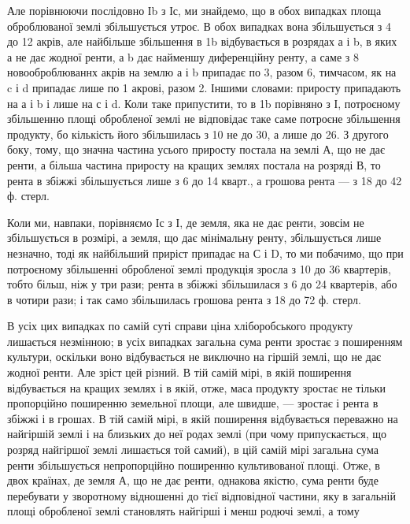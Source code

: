 Але порівнюючи послідовно Іb з Іс, ми знайдемо, що в обох випадках площа
оброблюваної землі збільшується утроє. В обох випадках вона збільшується з
4 до 12 акрів, але найбільше збільшення в 1b відбувається в розрядах
а і b, в яких а не дає жодної ренти, а b дає найменшу
диференційну ренту, а саме з 8 новооброблюваннх акрів на землю а і b
припадає по 3, разом 6, тимчасом,
як на c і d припадає лише по 1 акрові, разом 2. Іншими словами:  приросту
припадають на а і b і лише  на с і d. Коли таке припустити, то в
1b порівняно з І, потроєному збільшенню площі обробленої землі не відповідає
таке саме потроєне збільшення продукту, бо кількість його збільшилась з 10
не до 30, а лише до 26. З другого боку, тому, що значна частина усього приросту
постала на землі А, що не дає ренти, а більша частина приросту на
кращих землях постала на розряді В, то рента в збіжжі збільшується лише
з 6 до 14 кварт., а грошова рента — з 18 до 42 ф. стерл.

Коли ми, навпаки, порівняємо Іс з І, де земля, яка не дає ренти, зовсім
не збільшується в розмірі, а земля, що дає мінімальну ренту, збільшується
лише незначно, тоді як найбільший приріст припадає на С і D, то ми побачимо,
що при потроєному збільшенні обробленої землі продукція зросла з 10 до
36 квартерів, тобто більш, ніж у три рази; рента в збіжжі збільшилася з 6 до
24 квартерів, або в чотири рази; і так само збільшилась грошова рента
з 18 до 72 ф. стерл.

В усіх цих випадках по самій суті справи ціна хліборобського продукту
лишається незмінною; в усіх випадках загальна сума ренти зростає з поширенням
культури, оскільки воно відбувається не виключно на гіршій землі, що
не дає жодної ренти. Але зріст цей різний. В тій самій мірі, в якій поширення
відбувається на кращих землях і в якій, отже, маса продукту зростає не тільки
пропорційно поширенню земельної площи, але швидше, — зростає і рента в
збіжжі і в грошах. В тій самій мірі, в якій поширення відбувається переважно
на найгіршій землі і на близьких до неї родах землі (при чому припускається,
що розряд найгіршої землі лишається той самий), в цій самій мірі загальна
сума ренти збільшується непропорційно поширенню культивованої площі. Отже,
в двох країнах, де земля А, що не дає ренти, однакова якістю, сума ренти
буде перебувати у зворотному відношенні до тієї відповідної частини, яку в загальній
площі обробленої землі становлять найгірші і менш родючі землі, а тому

\parbreak{}  %
